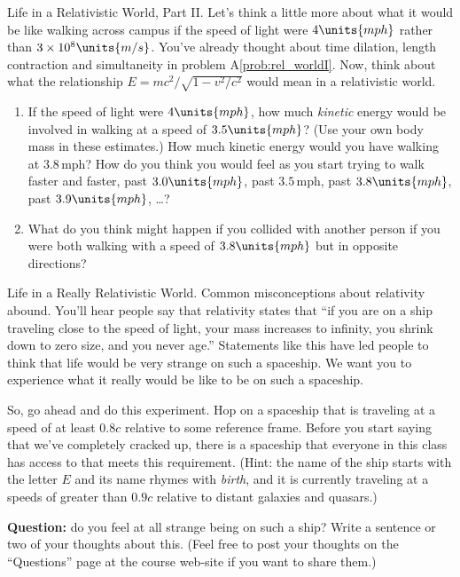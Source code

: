 \begin{aproblem}{Life in a Relativistic World, Part II.}  
  Let's think a little more about what it would be like walking across
  campus if the speed of light were $4\units{mph}$ rather than
  $3\times 10^8\units{m/s}$.  You've already thought about time
  dilation, length contraction and simultaneity in problem
  A\ref{prob:rel_worldI}.  Now, think about what the relationship $E =
  mc^2/\sqrt{1-v^2/c^2}$ would mean in a relativistic world.
  \begin{enumerate}
  \item If the speed of light were $4\units{mph}$, how much {\em
      kinetic} energy would be involved in walking at a speed of
    $3.5\units{mph}$?  (Use your own body mass in these estimates.)
    How much kinetic energy would you have walking at $3.8\,
    \mbox{mph}$?  How do you think you would feel as you start trying
    to walk faster and faster, past $3.0\units{mph}$, past $3.5\,
    \mbox{mph}$, past $3.8\units{mph}$, past $3.9\units{mph}$,
    \dots ?

  \item What do you think might happen if you collided with another
    person if you were both walking with a speed of $3.8\units{mph}$
    but in opposite directions?
  \end{enumerate}
\end{aproblem}

\begin{aproblem}{Life in a Really Relativistic World.} 
  Common misconceptions about relativity abound.  You'll hear people
  say that relativity states that ``if you are on a ship traveling
  close to the speed of light, your mass increases to infinity, you
  shrink down to zero size, and you never age.''  Statements like this
  have led people to think that life would be very strange on such a
  spaceship.  We want you to experience what it really would be like
  to be on such a spaceship. 

  So, go ahead and do this experiment.  Hop on a spaceship that is
  traveling at a speed of at least $0.8c$ relative to some reference
  frame.  Before you start saying that we've completely cracked up,
  there is a spaceship that everyone in this class has access to that
  meets this requirement.  (Hint: the name of the ship starts with the
  letter $E$ and its name rhymes with {\em birth}, and it is currently
  traveling at a speeds of greater than $0.9c$ relative to distant
  galaxies and quasars.) 

  {\bf Question:} do you feel at all strange being on such a ship?
  Write a sentence or two of your thoughts about this.  (Feel free to
  post your thoughts on the ``Questions'' page at the course web-site
  if you want to share them.)
\end{aproblem}

